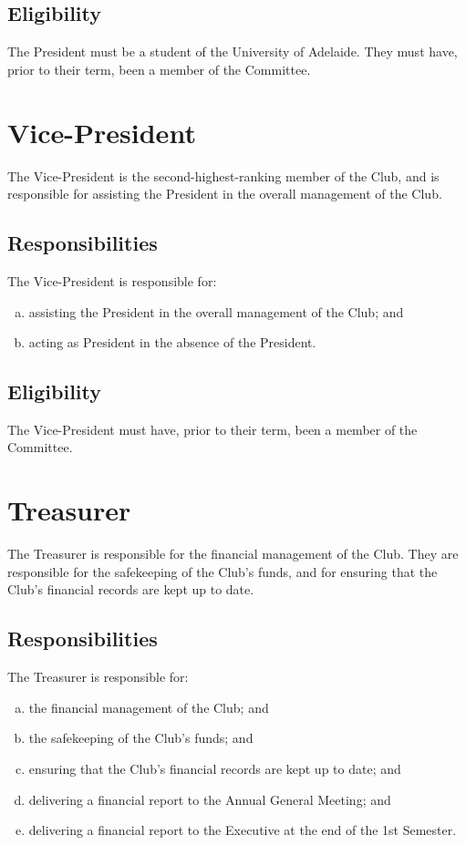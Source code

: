 \documentclass[11pt]{report}
\begin{document}
\subsection{Eligibility}
The President must be a student of the University of Adelaide. They must have, prior to their term, been a member of the Committee.

\section{Vice-President}
The Vice-President is the second-highest-ranking member of the Club, and is responsible for assisting the President in the overall management of the Club.
\subsection{Responsibilities}
The Vice-President is responsible for:
\begin{enumerate}[(a)]
    \item assisting the President in the overall management of the Club; and
    \item acting as President in the absence of the President.
\end{enumerate}
\subsection{Eligibility}
The Vice-President must have, prior to their term, been a member of the Committee.

\section{Treasurer}
The Treasurer is responsible for the financial management of the Club. They are responsible for the safekeeping of the Club's funds, and for ensuring that the Club's financial records are kept up to date.
\subsection{Responsibilities}
The Treasurer is responsible for:
\begin{enumerate}[(a)]
    \item the financial management of the Club; and
    \item the safekeeping of the Club's funds; and
    \item ensuring that the Club's financial records are kept up to date; and
    \item delivering a financial report to the Annual General Meeting; and
    \item delivering a financial report to the Executive at the end of the 1st Semester.
\end{enumerate}
\end{document}
